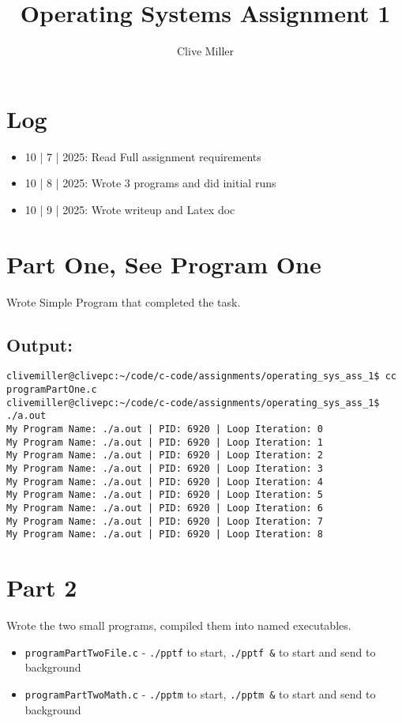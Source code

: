 \documentclass[11pt]{article}
\title{Operating Systems Assignment 1}
\author{Clive Miller}
\date{}
\begin{document}
\maketitle

\section*{Log}
\begin{itemize}
    \item 10 | 7 | 2025: Read Full assignment requirements
    \item 10 | 8 | 2025: Wrote 3 programs and did initial runs
    \item 10 | 9 | 2025: Wrote writeup and Latex doc
\end{itemize}

\section*{Part One, See Program One}
Wrote Simple Program that completed the task.

\subsection*{Output:}
\begin{lstlisting}[style=bash]
clivemiller@clivepc:~/code/c-code/assignments/operating_sys_ass_1$ cc programPartOne.c 
clivemiller@clivepc:~/code/c-code/assignments/operating_sys_ass_1$ ./a.out 
My Program Name: ./a.out | PID: 6920 | Loop Iteration: 0
My Program Name: ./a.out | PID: 6920 | Loop Iteration: 1
My Program Name: ./a.out | PID: 6920 | Loop Iteration: 2
My Program Name: ./a.out | PID: 6920 | Loop Iteration: 3
My Program Name: ./a.out | PID: 6920 | Loop Iteration: 4
My Program Name: ./a.out | PID: 6920 | Loop Iteration: 5
My Program Name: ./a.out | PID: 6920 | Loop Iteration: 6
My Program Name: ./a.out | PID: 6920 | Loop Iteration: 7
My Program Name: ./a.out | PID: 6920 | Loop Iteration: 8
\end{lstlisting}

\section*{Part 2}
Wrote the two small programs, compiled them into named executables.

\begin{itemize}
    \item \texttt{programPartTwoFile.c} - \texttt{./pptf} to start, \texttt{./pptf \&} to start and send to background
    \item \texttt{programPartTwoMath.c} - \texttt{./pptm} to start, \texttt{./pptm \&} to start and send to background
\end{itemize}
\end{document}
